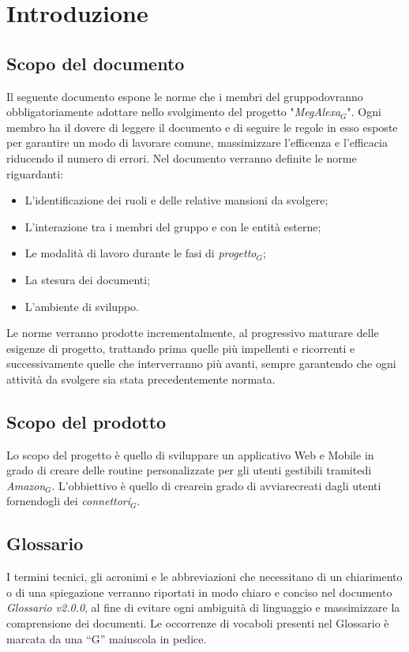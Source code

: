 \chapter{Introduzione}
\section{Scopo del documento}
Il seguente documento espone le norme che i membri del gruppodovranno obbligatoriamente adottare nello svolgimento del progetto "\textit{MegAlexa$_{G}$}".
Ogni membro ha il dovere di leggere il documento e di seguire le regole in esso esposte per garantire  un modo di lavorare comune, massimizzare l'efficenza e l'efficacia riducendo il numero di errori.
Nel documento verranno definite le  norme riguardanti:
\begin{itemize}
		\item L'identificazione dei ruoli e delle relative mansioni da svolgere;
		\item L'interazione tra i membri del gruppo e con le entità esterne;
		\item Le modalità di lavoro durante le fasi di \textit{progetto$_{G}$};
		\item La stesura dei documenti;
		\item L'ambiente di sviluppo.
\end{itemize}
Le norme verranno prodotte incrementalmente, al progressivo maturare delle esigenze di progetto, trattando prima quelle più impellenti e ricorrenti e successivamente quelle che interverranno più avanti, sempre garantendo che ogni attività da svolgere sia stata precedentemente normata.

\section{Scopo del prodotto}
Lo scopo del progetto è quello di sviluppare un applicativo Web e Mobile in grado di creare delle routine personalizzate per gli utenti gestibili tramitedi \textit{Amazon$_{G}$}. L'obbiettivo è quello di crearein grado di avviarecreati dagli utenti fornendogli dei \textit{connettori$_{G}$}.

\section{Glossario}
I termini tecnici, gli acronimi e le abbreviazioni che necessitano di un chiarimento
o di una spiegazione verranno riportati in modo chiaro e conciso nel
documento \textit{Glossario v2.0.0}, al fine di evitare ogni ambiguità di linguaggio
e massimizzare la comprensione dei documenti. Le occorrenze di vocaboli presenti nel Glossario è marcata da una “G” maiuscola in pedice.


